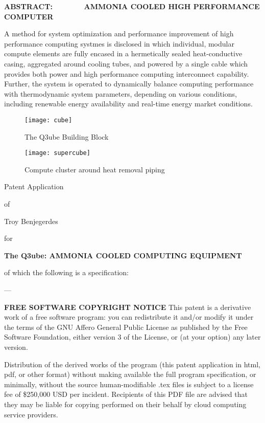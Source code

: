 \documentclass[times]{article}
\begin{document}
\begin{center}
{\bf ABSTRACT: ~~~~~~~AMMONIA COOLED HIGH PERFORMANCE COMPUTER}
\end{center}

A method for system optimization and performance improvement of high performance
computing systmes is disclosed in which individual, modular compute elements are
fully encased in a hermetically sealed heat-conductive casing, aggregated around
cooling tubes, and powered by a single cable which provides both power and high
performance computing interconnect capability. Further, the system is operated
to dynamically balance computing performance with thermodynamic system parameters,
depending on various conditions, including renewable energy availability and
real-time energy market conditions.

\begin{figure}
\begin{center}
\texttt{[image: cube]}
\caption{The Q3ube Building Block}
\label{cube}
\end{center}
\end{figure}

\begin{figure}
\begin{center}
\texttt{[image: supercube]}
\caption{Compute cluster around heat removal piping}
\label{supercube}
\end{center}
\end{figure}

\begin{center}
Patent Application

of

Troy Benjegerdes

for

{\bf The Q3ube: AMMONIA COOLED COMPUTING EQUIPMENT}

of which the following is a specification:

---

\end{center}

{\bf FREE SOFTWARE COPYRIGHT NOTICE}
This patent is a derivative work of a free software program: you can redistribute
it and/or modify it under the terms of the GNU Affero General Public License as
published by the Free Software Foundation, either version 3 of the License, or
(at your option) any later version.

Distribution of the derived works of the program (this patent application in 
html, pdf, or other format) without making available the full program specification,
or minimally, without the source human-modifiable .tex files is subject to a license
fee of \$250,000 USD per incident. Recipients of this PDF file are advised that they
may be liable for copying performed on their behalf by cloud computing service providers.
\end{document}

